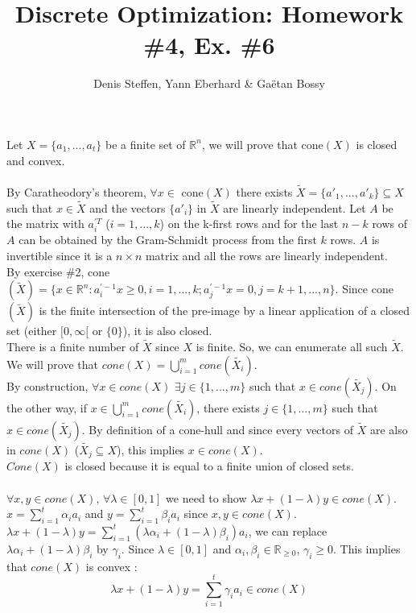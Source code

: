 \documentclass[a4paper,11pt,french]{article}
\title{Discrete Optimization: Homework \#4, Ex. \#6}
\author{Denis Steffen, Yann Eberhard \& Gaëtan Bossy}
\begin{document}
    
    \maketitle
    Let $X=\{ a_{1}, ... , a_{t}\}$ be a finite set of $\mathbb{R}^{n}$, we will prove that cone$(X)$ is closed and convex.
    \\
    \\
    By Caratheodory's theorem, $\forall x \in$ cone$(X)$ there exists $\widetilde{X}=\{ a'_{1}, ... , a'_{k}\} \subseteq X$ such that $x \in \widetilde{X}$ and the vectors $\{ a'_{i}\}$ in $\widetilde{X}$ are linearly independent. 
    Let $A$ be the matrix with $a_{i}^{\prime T}$ ($i=1, ... , k$) on the k-first rows and for the last $n-k$ rows of $A$ can be obtained by the Gram-Schmidt process from the first $k$ rows. $A$ is invertible since it is a $n \times n$ matrix and all the rows are linearly independent.
    \\
    By exercise \#2, cone$(\widetilde{X})=\{ x\in \mathbb{R}^{n} : a_{ i}^{\prime -1}x \geq 0, i=1, ... , k ; a_{j}^{\prime -1}x = 0, j=k+1, ... , n  \}$.
    Since cone$(\widetilde{X})$ is the finite intersection of the pre-image by a linear application of a closed set (either $[0, \infty[$ or $\{0\}$), it is also closed. 
    \\
    There is a finite number of $\widetilde{X}$ since $X$ is finite. So, we can enumerate all such $\widetilde{X}$. We will prove that $cone(X)=\displaystyle{\bigcup_{ i=1}^{m}} cone(\widetilde{X_{i}})$. 
    \\
    By construction, $\forall x \in cone(X)$ $\exists j \in \{1, ..., m\}$ such that $x \in cone(\widetilde{X_{j}})$. On the other way, if $x \in \displaystyle{\bigcup_{ i=1}^{m}} cone(\widetilde{X_{i}})$, there exists $j \in \{1, ... , m \}$ such that $x \in cone(\widetilde{X_{j}})$. 
    By definition of a cone-hull and since every vectors of $\widetilde{X}$ are also in $cone(X)$ ($\widetilde{X_{j}} \subseteq X$), this implies $x \in cone(X)$.
    \\
    $Cone(X)$ is closed because it is equal to a finite union of closed sets.
    \\
    \\
    $\forall x, y \in cone(X)$, $\forall \lambda \in [0,1]$ we need to show $\lambda 
    x +(1-\lambda)y \in cone(X)$. $x=\displaystyle{\sum_{i=1}^{t}} \alpha_{i} a_{i}$ and $y=\displaystyle{\sum_{i=1}^{t}} \beta_{i} a_{i}$ since $x,y \in cone(X)$.
    \\
    $\lambda x +(1-\lambda)y = \displaystyle{\sum_{i=1}^{t}} (\lambda \alpha_{i} + (1-\lambda)\beta_{i}) a_{i}$, we can replace $\lambda \alpha_{i} + (1-\lambda)\beta_{i}$ by $\gamma_{i}$. Since $\lambda \in [0,1]$ and $\alpha_{i}, \beta_{i} \in \mathbb{R}_{\geq 0}$, $\gamma_{i} \geq 0$. This implies that $cone(X)$ is convex :
    \begin{equation*}
    \lambda x +(1-\lambda)y = \displaystyle{\sum_{i=1}^{t}} \gamma_{i} a_{i} \in cone(X)
    \end{equation*}
    
    
    
\end{document}
